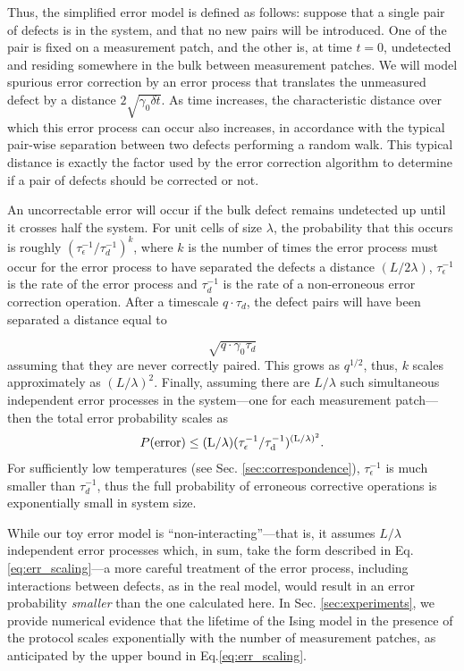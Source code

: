 \documentclass[twocolumn,superscriptaddress,aps,prb,floatfix]{revtex4-1}
\renewcommand*{\emph}[1]{{\it {#1}}}
\begin{document}
 Thus, the simplified error model is defined as follows:  suppose that a single pair of defects is in the system, and that no new pairs will be introduced.  One of the pair is fixed on a measurement patch, and the other is, at time $t=0$, undetected and residing somewhere in the bulk between measurement patches.  We will model spurious error correction by an error process that translates the unmeasured defect by a distance $2\sqrt{\gamma_0 \delta t}$. As time increases, the characteristic distance over which this error process can occur also increases, in accordance with the typical pair-wise separation between two defects performing a random walk.  This typical distance is exactly the factor used by the error correction algorithm to determine if a pair of defects should be corrected or not.
 
 An uncorrectable error will occur if the bulk defect remains undetected up until it crosses half the system.  For unit cells of size $\lambda$, the probability that this occurs is roughly $(\tau_{\epsilon}^{-1} / \tau_d^{-1})^{k}$, where $k$ is the number of times the error process must occur for the error process to have separated the defects a distance $(L/2\lambda)$, $\tau_{\epsilon}^{-1}$ is the rate of the error process and $\tau_d^{-1}$ is the rate of a non-erroneous error correction operation.  After a timescale $q\cdot\tau_{d}$, the defect pairs will have been separated a distance equal to

\begin{equation}  
\sqrt{q \cdot \gamma_0 \tau_{d}}
\end{equation}
 assuming that they are never correctly paired.  This grows as $q^{1/2}$, thus, $k$ scales approximately as $(L/\lambda)^{2}$.
Finally, assuming there are $L/\lambda$ such simultaneous independent error processes in the system---one for each measurement patch---then the total error probability scales as
\begin{align}
\label{eq:err_scaling}
 P(\rm{error})\leq (L/\lambda) (\tau_{\epsilon}^{-1} / \tau_d^{-1})^{(L/\lambda)^{2}}.
\end{align}
For sufficiently low temperatures (see Sec. \ref{sec:correspondence}), $\tau_{\epsilon}^{-1}$ is much smaller than $\tau_d^{-1}$, thus the full probability of erroneous corrective operations is exponentially small in system size.

While our toy error model is ``non-interacting''---that is, it assumes $L/\lambda$ independent error processes which, in sum, take the form described in Eq. \ref{eq:err_scaling}---a more careful treatment of the error process, including interactions between defects, as in the real model, would result in an error probability \emph{smaller} than the one calculated here.  In Sec. \ref{sec:experiments}, we provide numerical evidence that the lifetime of the Ising model in the presence of the protocol scales exponentially with the number of measurement patches, as anticipated by the upper bound in Eq.\ref{eq:err_scaling}.
\end{document}

